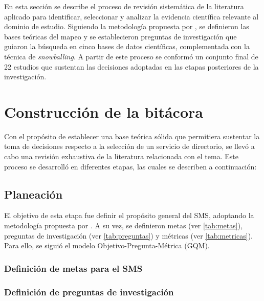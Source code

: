 \label{cap:revision-literatura}
\vspace*{0.7cm}

En esta sección se describe el proceso de revisión sistemática de la literatura aplicado para identificar, seleccionar y analizar la evidencia científica relevante al dominio de estudio. Siguiendo la metodología propuesta por \citet{Sepulveda2021}, se definieron las bases teóricas del mapeo y se establecieron preguntas de investigación que guiaron la búsqueda en cinco bases de datos científicas, complementada con la técnica de \textit{snowballing}. A partir de este proceso se conformó un conjunto final de 22 estudios que sustentan las decisiones adoptadas en las etapas posteriores de la investigación.

\section{Construcción de la bitácora}\label{sec:construccion-bitacora}

Con el propósito de establecer una base teórica sólida que permitiera sustentar la toma de decisiones respecto a la selección de un servicio de directorio, se llevó a cabo una revisión exhaustiva de la literatura relacionada con el tema. Este proceso se desarrolló en diferentes etapas, las cuales se describen a continuación:


\subsection{Planeación}\label{subsec:planeacion}

El objetivo de esta etapa fue definir el propósito general del \ac{SMS}, adoptando la metodología propuesta por \citet{Sepulveda2021}. A su vez, se definieron metas (ver \autoref{tab:metas}), preguntas de investigación (ver \autoref{tab:preguntas}) y métricas (ver \autoref{tab:metricas}). Para ello, se siguió el modelo Objetivo-Pregunta-Métrica (\acs{GQM}).


\subsubsection{Definición de metas para el \texorpdfstring{\ac{SMS}}{SMS}}



\subsubsection{Definición de preguntas de investigación}\label{subsubsec:rq-def}



